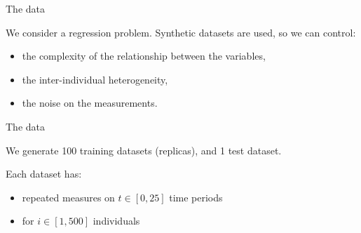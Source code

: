 \documentclass{beamer}
\begin{document}
\begin{frame}{The data}


	We consider a regression problem. Synthetic datasets are used, so we can control:
	\begin{itemize}
		\item the complexity of the relationship between the variables,
		\item the inter-individual heterogeneity,
		\item the noise on the measurements.
	\end{itemize}


	\bigskip
	\bigskip

\end{frame}




\begin{frame}{The data}

	We generate 100 training datasets (replicas), and 1 test dataset.
	\bigskip


	Each dataset has:
	\begin{itemize}
		\item repeated measures on $t \in [0,25]$ time periods
		\item for $i \in [1,500]$ individuals
	\end{itemize}

	\bigskip


\end{frame}
\end{document}
